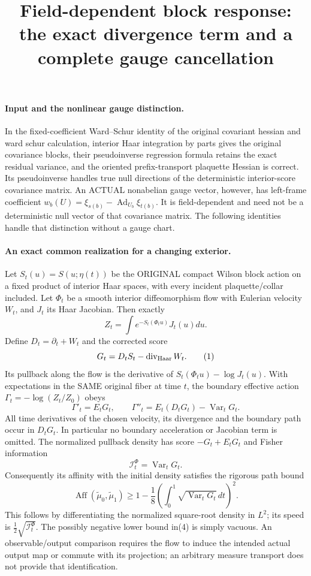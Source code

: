 \documentclass[11pt]{article}
\title{Field-dependent block response: the exact divergence term and a complete gauge cancellation}\author{}\date{}
\begin{document}
\maketitle
\paragraph{Input and the nonlinear gauge distinction.}
In the fixed-coefficient Ward--Schur identity of the original covariant hessian and ward schur calculation, interior Haar
integration by parts gives the original covariance blocks, their pseudoinverse
regression formula retains the exact residual variance, and the oriented
prefix-transport plaquette Hessian is correct. Its pseudoinverse handles true
null directions of the deterministic interior-score covariance matrix.
An ACTUAL nonabelian gauge vector, however, has left-frame coefficient
$w_b(U)=\xi_{s(b)}-\operatorname{Ad}_{U_b}\xi_{t(b)}$. It is field-dependent
and need not be a deterministic null vector of that covariance matrix. The
following identities handle that distinction without a gauge chart.

\paragraph{An exact common realization for a changing exterior.}
Let $S_t(u)=S(u;\eta(t))$ be the ORIGINAL compact Wilson block action on a
fixed product of interior Haar spaces, with every incident plaquette/collar
included. Let $\Phi_t$ be a smooth interior diffeomorphism flow with Eulerian
velocity $W_t$, and $J_t$ its Haar Jacobian. Then exactly
\[
 Z_t=\int e^{-S_t(\Phi_tu)}J_t(u)du.
\]
Define $D_t=\partial_t+W_t$ and the corrected score
\[
 G_t=D_tS_t-\operatorname{div}_{\rm Haar}W_t.                            \tag{1}
\]
Its pullback along the flow is the derivative of
$S_t(\Phi_tu)-\log J_t(u)$. With expectations in the SAME original fiber at
time $t$, the boundary effective action $\Gamma_t=-\log(Z_t/Z_0)$ obeys
\[
 \Gamma'_t=E_tG_t,\qquad
 \Gamma''_t=E_t(D_tG_t)-\operatorname{Var}_tG_t.                          \tag{2}
\]
All time derivatives of the chosen velocity, its divergence and the boundary
path occur in $D_tG_t$. In particular no boundary acceleration or Jacobian
term is omitted. The normalized pullback density has score
$-G_t+E_tG_t$ and Fisher information
\[
 \mathcal I_t^{\Phi}=\operatorname{Var}_tG_t.                            \tag{3}
\]
Consequently its affinity with the initial density satisfies the rigorous
path bound
\[
 \operatorname{Aff}(\widetilde\mu_0,\widetilde\mu_1)
 \ge1-\frac18\left(\int_0^1\sqrt{\operatorname{Var}_tG_t}\,dt\right)^2. \tag{4}
\]
This follows by differentiating the normalized square-root density in $L^2$;
its speed is $\frac12\sqrt{\mathcal I_t^{\Phi}}$. The possibly negative lower
bound in(4) is simply vacuous. An observable/output comparison requires the
flow to induce the intended actual output map or commute with its projection;
an arbitrary measure transport does not provide that identification.
\end{document}
